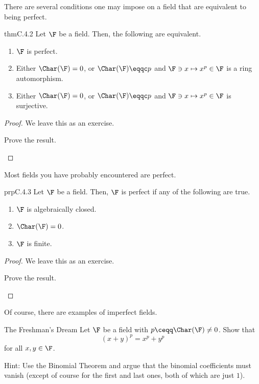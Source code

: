 There are several conditions one may impose on a field that are equivalent to being perfect.
\begin{thm}{}{thmC.4.2}
	Let $\F$ be a field.  Then, the following are equivalent.
	\begin{enumerate}
		\item $\F$ is perfect.
		\item Either $\Char (\F )=0$, or $\Char (\F )\eqqc p$ and $\F \ni x\mapsto x^p\in \F$ is a ring automorphism.
		\item Either $\Char (\F )=0$, or $\Char (\F )\eqqc p$ and $\F \ni x\mapsto x^p\in \F$ is surjective.
	\end{enumerate}
	\begin{proof}
		We leave this as an exercise.
		\begin{exr}[breakable=false]{}{}
			Prove the result.
		\end{exr}
	\end{proof}
\end{thm}
Most fields you have probably encountered are perfect.
\begin{prp}{}{prpC.4.3}
	Let $\F$ be a field.  Then, $\F$ is perfect if any of the following are true.
	\begin{enumerate}
		\item $\F$ is algebraically closed.
		\item $\Char (\F )=0$.
		\item $\F$ is finite.
	\end{enumerate}
	\begin{proof}
		We leave this as an exercise.
		\begin{exr}[breakable=false]{}{}
			Prove the result.
		\end{exr}
	\end{proof}
\end{prp}
Of course, there are examples of imperfect fields.
\begin{exr}{The Freshman's Dream}{}
	Let $\F$ be a field with $p\ceqq \Char (\F )\neq 0$.  Show that
	\begin{equation}
		(x+y)^p=x^p+y^p
	\end{equation}
	for all $x,y\in \F$.
	\begin{rmk}
		Hint:  Use the Binomial Theorem and argue that the binomial coefficients must vanish (except of course for the first and last ones, both of which are just $1$).
	\end{rmk}
\end{exr}
